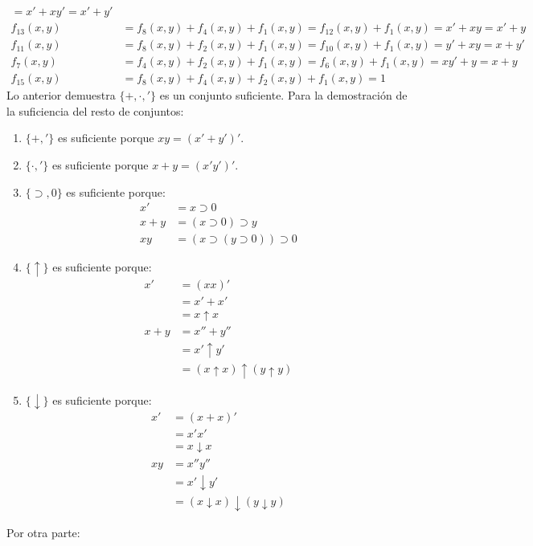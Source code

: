 \begin{solution}
\begin{align*}
                 =x'+xy'=x'+y'\\
    f_{13}(x,y)&=f_{8}(x,y)+f_{4}(x,y)+f_{1}(x,y)=f_{12}(x,y)+f_{1}(x,y)
                 =x'+xy=x'+y\\
    f_{11}(x,y)&=f_{8}(x,y)+f_{2}(x,y)+f_{1}(x,y)=f_{10}(x,y)+f_{1}(x,y)
                     =y'+xy=x+y'\\
    f_{7}(x,y)&=f_{4}(x,y)+f_{2}(x,y)+f_{1}(x,y)=f_{6}(x,y)+f_{1}(x,y)
                =xy'+y=x+y\\
    f_{15}(x,y)&=f_{8}(x,y)+f_{4}(x,y)+f_{2}(x,y)+f_{1}(x,y)=1
  \end{align*}
  Lo anterior demuestra $\{+,\cdot,'\}$ es un conjunto
  suficiente. Para la demostración de la suficiencia del resto de conjuntos:
  \begin{enumerate}
  \item $\{+,'\}$ es suficiente porque $xy=(x'+y')'$.
  \item $\{\cdot,'\}$ es suficiente porque $x+y=(x'y')'$.
  \item $\{\supset,0\}$ es suficiente porque:
    \begin{align*}
      x'&=x\supset 0\\
      x+y&=(x\supset 0)\supset y\\
      xy&=(x\supset(y\supset 0))\supset 0
    \end{align*}
  \item $\{\uparrow\}$ es suficiente porque:
    \begin{align*}
      x'&=(xx)'\\
        &=x'+x'\\
        &=x\uparrow x\\
      x+y&=x''+y''\\
         &=x'\uparrow y'\\
         &=(x\uparrow x)\uparrow(y\uparrow y)
    \end{align*}
  \item $\{\downarrow\}$ es suficiente porque:
    \begin{align*}
      x'&=(x+x)'\\
        &=x'x'\\
        &=x\downarrow x\\
      xy&=x''y''\\
        &=x'\downarrow y'\\
        &=(x\downarrow x)\downarrow (y\downarrow y)
    \end{align*}
  \end{enumerate}
  Por otra parte:
  \begin{align*}

\end{align*}
\end{solution}
